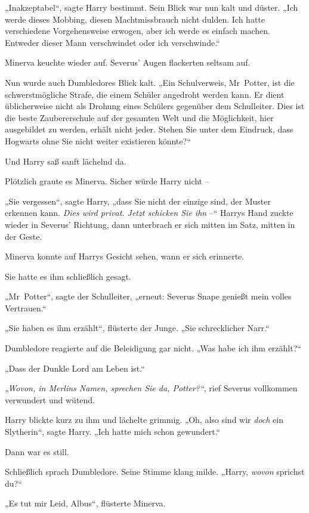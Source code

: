 „Inakzeptabel“, sagte Harry bestimmt. Sein Blick war nun kalt und düster. „Ich werde dieses Mobbing, diesen Machtmissbrauch nicht dulden. Ich hatte verschiedene Vorgehensweise erwogen, aber ich werde es einfach machen. Entweder dieser Mann verschwindet oder ich verschwinde.“ 

Minerva keuchte wieder auf. Severus’ Augen flackerten seltsam auf. 

Nun wurde auch Dumbledores Blick kalt. „Ein Schulverweis, Mr~Potter, ist die schwerstmögliche Strafe, die einem Schüler angedroht werden kann. Er dient üblicherweise nicht als Drohung eines Schülers gegenüber dem Schulleiter. Dies ist die beste Zaubererschule auf der gesamten Welt und die Möglichkeit, hier ausgebildet zu werden, erhält nicht jeder. Stehen Sie unter dem Eindruck, dass Hogwarts ohne Sie nicht weiter existieren könnte?“ 

Und Harry saß sanft lächelnd da. 

Plötzlich graute es Minerva. Sicher würde Harry nicht – 

„Sie vergessen“, sagte Harry, „dass Sie nicht der einzige sind, der Muster erkennen kann. \emph{Dies wird privat. Jetzt schicken Sie ihn} –“ Harrys Hand zuckte wieder in Severus’ Richtung, dann unterbrach er sich mitten im Satz, mitten in der Geste. 

Minerva konnte auf Harrys Gesicht sehen, wann er sich erinnerte. 

Sie hatte es ihm schließlich gesagt. 

„Mr~Potter“, sagte der Schulleiter, „erneut: Severus Snape genießt mein volles Vertrauen.“ 

„Sie haben es ihm erzählt“, flüsterte der Junge. „Sie schrecklicher Narr.“ 

Dumbledore reagierte auf die Beleidigung gar nicht. „Was habe ich ihm erzählt?“ 

„Dass der Dunkle Lord am Leben ist.“ 

\emph{„Wovon, in Merlins Namen, sprechen Sie da, Potter?“}, rief Severus vollkommen verwundert und wütend. 

Harry blickte kurz zu ihm und lächelte grimmig. „Oh, also sind wir \emph{doch} ein Slytherin“, sagte Harry. „Ich hatte mich schon gewundert.“ 

Dann war es still. 

Schließlich sprach Dumbledore. Seine Stimme klang milde. „Harry, \emph{wovon} sprichst du?“ 

„Es tut mir Leid, Albus“, flüsterte Minerva. 

